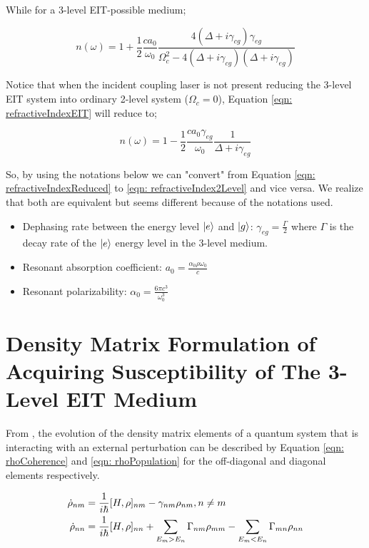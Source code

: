 While for a 3-level EIT-possible medium;

\begin{equation}
    n(\omega) = 1 + \frac{1}{2} \frac{c a_{0}}{\omega_{0}} \frac{4(\Delta + i\gamma_{cg})\gamma_{eg}}{\Omega_{c}^{2} - 4(\Delta + i\gamma_{cg})(\Delta + i\gamma_{eg})}
    \label{eqn: refractiveIndexEIT}
\end{equation}

Notice that when the incident coupling laser is not present reducing the 3-level EIT system into ordinary 2-level system ($\Omega_{c} = 0$), Equation \ref{eqn: refractiveIndexEIT} will reduce to;

\begin{equation}
    n(\omega) = 1 - \frac{1}{2} \frac{c a_{0} \gamma_{eg}}{\omega_{0}} \frac{1}{\Delta + i\gamma_{eg}}
    \label{eqn: refractiveIndexReduced}
\end{equation}

So, by using the notations below we can "convert" from Equation \ref{eqn: refractiveIndexReduced} to \ref{eqn: refractiveIndex2Level} and vice versa. We realize that both are equivalent but seems different because of the notations used.

\begin{itemize}
    \item Dephasing rate between the energy level $\ket{e}$ and $\ket{g}$: $\gamma_{eg} = \frac{\Gamma}{2}$ where $\Gamma$ is the decay rate of the $\ket{e}$ energy level in the 3-level medium. 
    \item Resonant absorption coefficient: $a_{0} = \frac{\alpha_{0} \rho \omega_{0}}{c}$
    \item Resonant polarizability: $\alpha_{0} = \frac{6\pi c^{3}}{\omega_{0}^{3}}$
\end{itemize}


\section{Density Matrix Formulation of Acquiring Susceptibility of The 3-Level EIT Medium}
From , the evolution of the density matrix elements of a quantum system that is interacting with an external perturbation can be described by Equation \ref{eqn: rhoCoherence} and \ref{eqn: rhoPopulation} for the off-diagonal and diagonal elements respectively.

\begin{align}
    \Dot{\rho}_{nm} &= \frac{1}{i\hbar} [H, \rho]_{nm} - \gamma_{nm} \rho_{nm}, \space n \neq m \label{eqn: rhoCoherence}\\
    \Dot{\rho}_{nn} &= \frac{1}{i\hbar} [H, \rho]_{nn} + \sum_{E_{m} > E_{n}} \Gamma_{nm}\rho_{mm} - \sum_{E_{m} < E_{n}} \Gamma_{mn} \rho_{nn} \label{eqn: rhoPopulation}
\end{align} 

